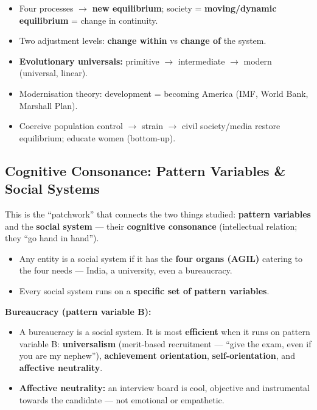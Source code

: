 \begin{QuickRevision}
\begin{itemize}
\item Four processes $\rightarrow$ \textbf{new equilibrium}; society = \textbf{moving/dynamic equilibrium} = change in continuity.
\item Two adjustment levels: \textbf{change within} vs \textbf{change of} the system.
\item \textbf{Evolutionary universals:} primitive $\rightarrow$ intermediate $\rightarrow$ modern (universal, linear).
\item Modernisation theory: development = becoming America (IMF, World Bank, Marshall Plan).
\item Coercive population control $\rightarrow$ strain $\rightarrow$ civil society/media restore equilibrium; educate women (bottom-up).
\end{itemize}
\end{QuickRevision}

\sectiondivider

\subsection{Cognitive Consonance: Pattern Variables \& Social Systems}

This is the ``patchwork'' that connects the two things studied: \textbf{pattern variables} and the \textbf{social system} --- their \textbf{cognitive consonance} (intellectual relation; they ``go hand in hand'').

\begin{KeyConcept}
\begin{itemize}
\item Any entity is a social system if it has the \textbf{four organs (AGIL)} catering to the four needs --- India, a university, even a bureaucracy.
\item Every social system runs on a \textbf{specific set of pattern variables}.
\end{itemize}
\end{KeyConcept}

\begin{ComparisonBox}
\textbf{Bureaucracy (pattern variable B):}
\begin{itemize}
\item A bureaucracy is a social system. It is most \textbf{efficient} when it runs on pattern variable B: \textbf{universalism} (merit-based recruitment --- ``give the exam, even if you are my nephew''), \textbf{achievement orientation}, \textbf{self-orientation}, and \textbf{affective neutrality}.
\item \textbf{Affective neutrality:} an interview board is cool, objective and instrumental towards the candidate --- not emotional or empathetic.
\end{itemize}
\end{ComparisonBox}

